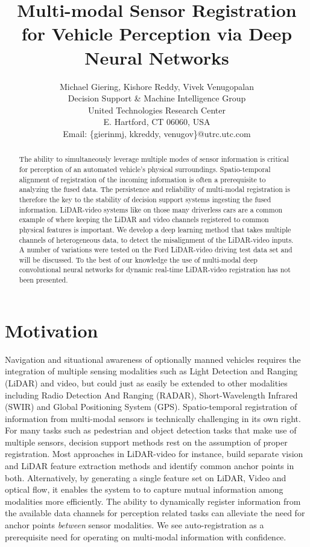 \documentclass{article}
\title{Multi-modal Sensor Registration for Vehicle Perception via Deep Neural Networks}
\author{Michael Giering, Kishore Reddy, Vivek Venugopalan\\
Decision Support \& Machine Intelligence Group \\
United Technologies Research Center\\
E. Hartford, CT 06060, USA \\
Email: \{gierinmj, kkreddy, venugov\}@utrc.utc.com}
\begin{document}
\maketitle

\begin{abstract}

The ability to simultaneously leverage multiple modes of sensor information is critical for perception of an automated vehicle's physical surroundings. Spatio-temporal alignment of registration of the incoming information is often a prerequisite to analyzing the fused data. The persistence and reliability of multi-modal registration is therefore the key to the stability of decision support systems ingesting the fused information. LiDAR-video systems like on those many driverless cars are a common example of where keeping the LiDAR and video channels registered to common physical features is important. We develop a deep learning method that takes multiple channels of heterogeneous data, to detect the misalignment of the LiDAR-video inputs.  A number of variations were tested on the Ford LiDAR-video driving test data set and will be discussed. To the best of our knowledge the use of multi-modal deep convolutional neural networks for dynamic real-time LiDAR-video registration has not been presented.

\end{abstract}

\section{Motivation} %
\label{sec:motivation}
Navigation and situational awareness of optionally manned vehicles requires the integration of multiple sensing modalities such as Light Detection and Ranging (LiDAR) and video, but could just as easily be extended to other modalities including Radio Detection And Ranging (RADAR), Short-Wavelength Infrared (SWIR) and Global Positioning System (GPS). Spatio-temporal registration of information from multi-modal sensors is technically challenging in its own right. For many tasks such as pedestrian and object detection tasks that make use of multiple sensors, decision support methods rest on the assumption of proper registration. Most approaches \cite{Bodensteiner2012Real-time-} in LiDAR-video for instance, build separate vision and LiDAR feature extraction methods and identify common anchor points in both. Alternatively, by generating a single feature set on LiDAR, Video and optical flow, it enables the system to to capture mutual information among modalities more efficiently. The ability to dynamically register information from the available data channels for perception related tasks can alleviate the need for anchor points \emph{between} sensor modalities. We see auto-registration as a prerequisite need for operating on multi-modal information with confidence.
\end{document}
